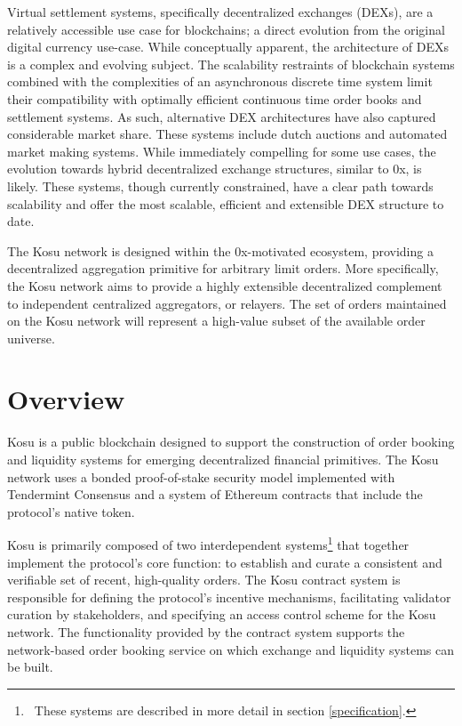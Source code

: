 \documentclass[10pt]{article}
\begin{document}
Virtual settlement systems, specifically decentralized exchanges (DEXs), are a relatively accessible use case for blockchains; a direct evolution from the original digital currency use-case. While conceptually apparent, the architecture of DEXs is a complex and evolving subject. The scalability restraints of blockchain systems combined with the complexities of an asynchronous discrete time system limit their compatibility with optimally efficient continuous time order books and settlement systems\cite{flash-boys-2}. As such, alternative DEX architectures have also captured considerable market share. These systems include dutch auctions and automated market making systems. While immediately compelling for some use cases, the evolution towards hybrid decentralized exchange structures, similar to 0x, is likely. These systems, though currently constrained, have a clear path towards scalability and offer the most scalable, efficient and extensible DEX structure to date\cite{0x-roadmap-pt-2}. 
\medskip

The Kosu network is designed within the 0x-motivated ecosystem, providing a decentralized aggregation primitive for arbitrary limit orders. More specifically, the Kosu network aims to provide a highly extensible decentralized complement to independent centralized aggregators, or relayers. The set of orders maintained on the Kosu network will represent a high-value subset of the available order universe.
\clearpage
\pagebreak


\section{Overview}\label{overview}
Kosu is a public blockchain designed to support the construction of order booking and liquidity systems for emerging decentralized financial primitives. The Kosu network uses a bonded proof-of-stake security model implemented with Tendermint Consensus\cite{tendermint} and a system of Ethereum contracts that include the protocol’s native token.
\medskip

Kosu is primarily composed of two interdependent systems\footnote{\ These systems are described in more detail in section \ref{specification}.} that together implement the protocol’s core function: to establish and curate a consistent and verifiable set of recent, high-quality orders. The Kosu contract system is responsible for defining the protocol's incentive mechanisms, facilitating validator curation by stakeholders, and specifying an access control scheme for the Kosu network. The functionality provided by the contract system supports the network-based order booking service on which exchange and liquidity systems can be built.
\medskip
\end{document}
